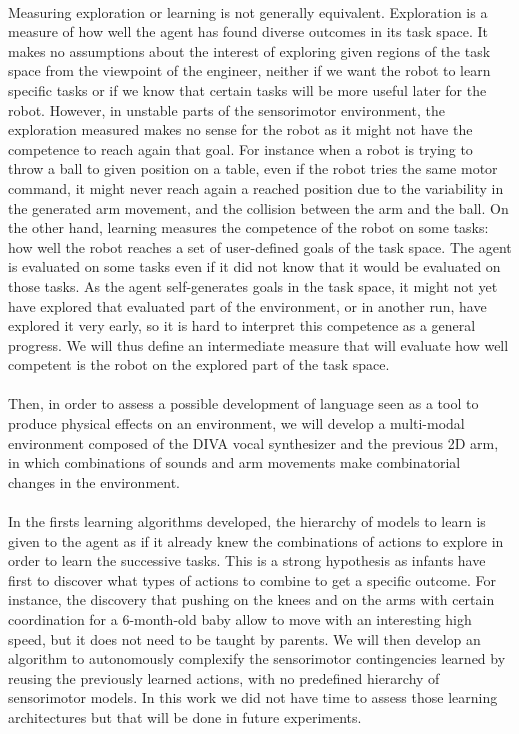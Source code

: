 \documentclass[12pt]{article}
\begin{document}
	\paragraph{}
	Measuring exploration or learning is not generally equivalent. 
	Exploration is a measure of how well the agent has found diverse outcomes in its task space. 
	It makes no assumptions about the interest of exploring given regions of the task space from the viewpoint of the engineer, 
	neither if we want the robot to learn specific tasks or if we know that certain tasks will be more useful later for the robot.
	However, in unstable parts of the sensorimotor environment, the exploration measured makes no sense for the robot as it might not have the competence to 
	reach again that goal.
	For instance when a robot is trying to throw a ball to given position on a table, 
	even if the robot tries the same motor command, it might never reach again a reached position due to the variability in the generated arm movement, and 
	the collision between the arm and the ball.
	On the other hand, learning measures the competence of the robot on some tasks: how well the robot reaches a set of user-defined 
	goals of the task space. The agent is evaluated on some tasks even if it did not know that it 
	would be evaluated on those tasks. 
	As the agent self-generates goals in the task space, it might not yet have explored that evaluated part of the environment, or in another run, have explored
	it very early, so it is hard to interpret this competence as a general progress.
	We will thus define an intermediate measure that will evaluate how well competent is the robot on the explored part of the task space.
	
	\paragraph{}
	Then, in order to assess a possible development of language seen as a tool to produce physical effects on an environment, 
	we will develop a multi-modal environment composed of the DIVA vocal synthesizer \cite{guenther2006neural} and the previous 2D arm, in which combinations 
	of sounds and arm movements make combinatorial changes in the environment.
	
	\paragraph{}
	In the firsts learning algorithms developed, the hierarchy of models to learn is given to the agent as if it already knew the combinations of actions
	to explore in order to learn the successive tasks.
	This is a strong hypothesis as infants have first to discover what types of actions to combine to get a specific outcome.
	For instance, the discovery that pushing on the knees and on the arms with certain coordination for a 6-month-old baby allow to move with an interesting high speed, but it does not need to be taught by parents.
	We will then develop an algorithm to autonomously complexify the sensorimotor contingencies learned by reusing the previously learned actions, with no
	predefined hierarchy of sensorimotor models.
	In this work we did not have time to assess those learning architectures but that will be done in future experiments.
	
\end{document}
